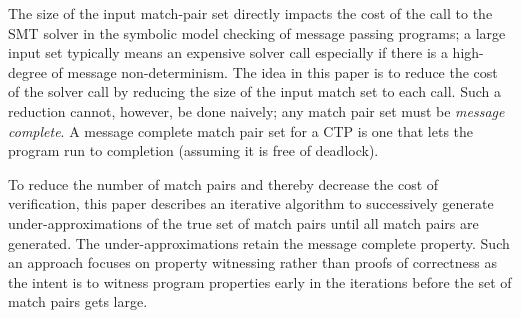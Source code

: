 The size of the input match-pair set directly impacts the cost of the call to the SMT solver in the symbolic model checking of message passing programs; a large input set typically means an expensive solver call especially if there is a high-degree of message non-determinism. The idea in this paper is to reduce the cost of the solver call by reducing the size of the input match set to each call. Such a reduction cannot, however, be done naively; any match pair set must be \emph{message complete}.  A message complete match pair set for a CTP is one that lets the program run to completion (assuming it is free of deadlock). 


To reduce the number of match pairs and thereby decrease the cost of verification, this paper describes an iterative algorithm to successively generate under-approximations of the true set of match pairs until all match pairs are generated. The under-approximations retain the message complete property. 
Such an approach focuses on property witnessing rather than proofs of correctness as the intent is to witness program properties early in the iterations before the set of match pairs gets large.



